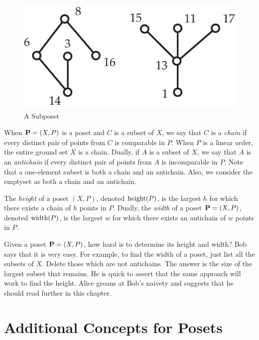 \begin{figure}
\begin{center}
\includegraphics*[scale=.4]{posets-figs/subposet.pdf}
\caption{A Subposet}
\label{fig:subposet}
\end{center}
\end{figure}

When $\mathbf{P}=(X,P)$ is a poset and $C$ is a subset of $X$,
we say that $C$ is a \textit{chain} if every distinct pair of points 
from $C$ is comparable in $P$.  When $P$ is a linear order, the entire ground 
set $X$ is a chain.  Dually, if $A$ is a subset of $X$, we say that
$A$ is an \textit{antichain} if every distinct pair of points from $A$ 
is incomparable in $P$.  Note that a one-element subset
is both a chain and an antichain.  Also, we consider the emptyset as
both a chain and an antichain.

The \textit{height} of a poset
$(X,P)$, denoted $\operatorname{height}(P)$, is the largest $h$ for which there exists
a chain of $h$ points in $P$.
Dually, the \textit{width} of a poset $\mathbf{P}=(X,P)$, denoted $\operatorname{width}(P)$, is the
largest $w$ for which there exists an antichain of $w$ points in
$P$. 

\begin{remark}
Given a poset $\mathbf{P}=(X,P)$, how hard is to determine its height and width?
Bob says that it is very easy.  For example, to find the width of a poset, just 
list all the subsets of $X$.  Delete those which are not antichains.
The answer is the size of the largest subset that remains.  He is quick
to assert that the same approach will work to find the height.
Alice groans at Bob's naivety and suggests that he should read
further in this chapter.
\end{remark}

\section{Additional Concepts for Posets}\label{s:posets:additional-concepts}

